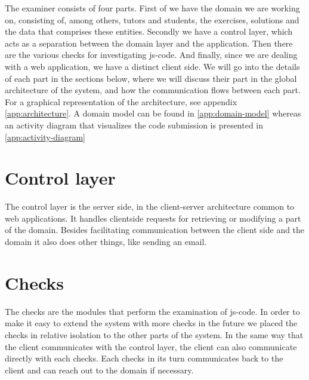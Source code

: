 %

The \gls{examiner} consists of four parts.
First of we have the domain we are working on, consisting of, among others,
tutors and students, the exercises, solutions
and the data that comprises these entities.
Secondly we have a control layer,
which acts as a separation between the domain layer and the application.
Then there are the various \glspl{check} for investigating \gls{js-code}.
And finally, since we are dealing with a web application,
we have a distinct client side.
We will go into the details of each part in the sections below,
where we will discuss their part in the global architecture of the system,
and how the communication flows between each part. For a graphical 
representation of the architecture, see appendix \ref{app:architecture}. A 
domain model can be found in \ref{app:domain-model} whereas an activity diagram 
that visualizes the code submission is presented in \ref{app:activity-diagram}

\section{Control layer}
The control layer is the server side,
in the client-server architecture common to web applications.
It handles clientside requests
for retrieving or modifying a part of the domain.
Besides facilitating communication between the client side and the domain
it also does other things, like sending an email.

\section{Checks}
The \glspl{check} are the modules that perform the examination of \gls{js-code}.
In order to make it easy to extend the system with more \glspl{check} in the future
we placed the \glspl{check} in relative isolation to the other parts of the system.
In the same way that the client communicates with the control layer,
the client can also communicate directly with each \glspl{check}.
Each \glspl{check} in its turn communicates back to the client
and can reach out to the domain if necessary.

